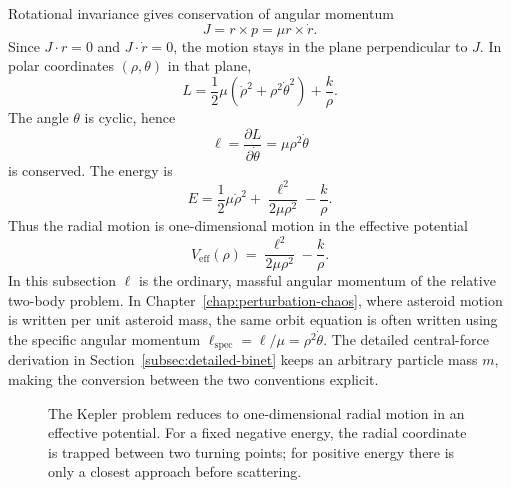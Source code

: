 Rotational invariance gives conservation of angular momentum
\[
  J=r\times p=\mu r\times\dot r.
\]
Since \(J\cdot r=0\) and \(J\cdot \dot r=0\), the motion stays in the plane
perpendicular to \(J\). In polar coordinates \((\rho,\theta)\) in that plane,
\[
  L=\frac12\mu(\dot\rho^2+\rho^2\dot\theta^2)+\frac{k}{\rho}.
\]
The angle \(\theta\) is cyclic, hence
\[
  \ell=\frac{\partial L}{\partial\dot\theta}=\mu\rho^2\dot\theta
\]
is conserved. The energy is
\[
  E=\frac12\mu\dot\rho^2+\frac{\ell^2}{2\mu\rho^2}-\frac{k}{\rho}.
\]
Thus the radial motion is one-dimensional motion in the effective potential
\[
  V_{\mathrm{eff}}(\rho)=\frac{\ell^2}{2\mu\rho^2}-\frac{k}{\rho}.
\]
In this subsection \(\ell\) is the ordinary, massful angular momentum of the
relative two-body problem. In Chapter~\ref{chap:perturbation-chaos}, where
asteroid motion is written per unit asteroid mass, the same orbit equation is
often written using the specific angular momentum
\(\ell_{\mathrm{spec}}=\ell/\mu=\rho^2\dot\theta\). The detailed central-force
derivation in Section~\ref{subsec:detailed-binet} keeps an arbitrary particle
mass \(m\), making the conversion between the two conventions explicit.

\begin{figure}[htbp]
\centering
{}
\caption{The Kepler problem reduces to one-dimensional radial motion in an
effective potential. For a fixed negative energy, the radial coordinate is
trapped between two turning points; for positive energy there is only a closest
approach before scattering.}
\label{fig:kepler-effective-potential}
\end{figure}

